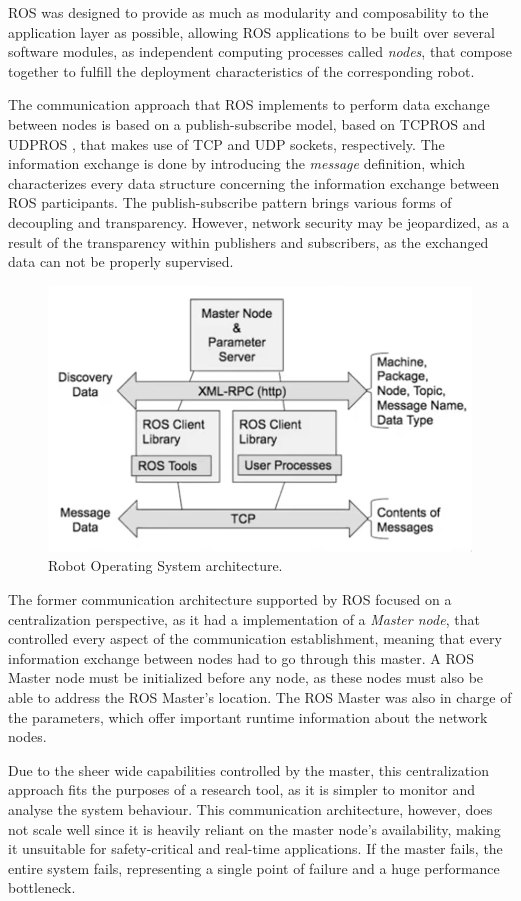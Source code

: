 ROS was designed to provide as much as modularity and composability to the application layer \cite{casini2019response} as possible, allowing ROS applications to be built over several software modules, as independent computing processes called \textit{nodes}, that compose together to fulfill the deployment characteristics of the corresponding robot. \cite{maruyama2016exploring} 

The communication approach that ROS implements to perform data exchange between nodes is based on a publish-subscribe model, based on TCPROS \cite{tcpros} and UDPROS \cite{udpros}, that makes use of TCP and UDP sockets, respectively. \cite{maruyama2016exploring} The information exchange is done by introducing the \textit{message} definition, which characterizes every data structure concerning the information exchange between ROS participants. The publish-subscribe pattern brings various forms of decoupling and transparency. However, network security may be jeopardized, as a result of the transparency within publishers and subscribers, as the exchanged data can not be properly supervised. \cite{kim2018security}

\begin{figure}[H]
        \centering
        \includegraphics[width=0.5\linewidth]{images/former-ros1-architecture.png}
        \caption{Robot Operating System architecture.}
        \label{fig:ros1-architecture}
\end{figure}

The former communication architecture supported by ROS focused on a centralization perspective, as it had a implementation of a \textit{Master node}, that controlled every aspect of the communication establishment, meaning that every information exchange between nodes had to go through this master. A ROS Master node must be initialized before any node, as these nodes must also be able to address the ROS Master's location. The ROS Master was also in charge of the parameters, which offer important runtime information about the network nodes.

Due to the sheer wide capabilities controlled by the master, this centralization approach fits the purposes of a research tool, as it is simpler to monitor and analyse the system behaviour. This communication architecture, however, does not scale well since it is heavily reliant on the master node's availability, making it unsuitable for safety-critical and real-time applications. If the master fails, the entire system fails, representing a single point of failure and a huge performance bottleneck.

